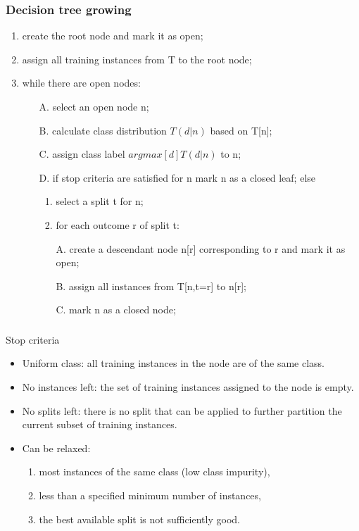 \documentclass[smaller, proffesionalfonts]{beamer}
\begin{document}
\begin{frame}
\frametitle{Decision tree growing}
\begin{block}{}
\begin{enumerate}
\item create the root node and mark it as open;
\item assign all training instances from T to the root node;
\item while there are open nodes:
\begin{itemize}
\item[A.] select an open node n;
\item[B.] calculate class distribution $T(d|n)$ based on T[n];
\item[C.] assign class label $argmax[d]T(d|n)$ to n;
\item[D.] if stop criteria are satisfied for n mark n as a closed leaf; else
\begin{enumerate}
\item select a split t for n; 
\item for each outcome r of split t:
\item[A.] create a descendant node n[r] corresponding to r and mark it as open;
\item[B.] assign all instances from T[n,t=r] to n[r];
\item[C.] mark n as a closed node;
\end{enumerate}
\end{itemize}
\end{enumerate}
\end{block}
\end{frame}

\begin{frame}
\frametitle{}
\begin{block}{Stop criteria}
\begin{itemize}
\item Uniform class: all training instances in the node are of the same class.
\item No instances left: the set of training instances assigned to the node is empty.
\item No splits left: there is no split that can be applied to further partition the current subset of training instances.
\item Can be relaxed:
\begin{enumerate}
\item most instances of the same class (low class impurity),
\item less than a specified minimum number of instances,
\item the best available split is not sufficiently good.
\end{enumerate}
\end{itemize}
\end{block}
\end{frame}
\end{document}
